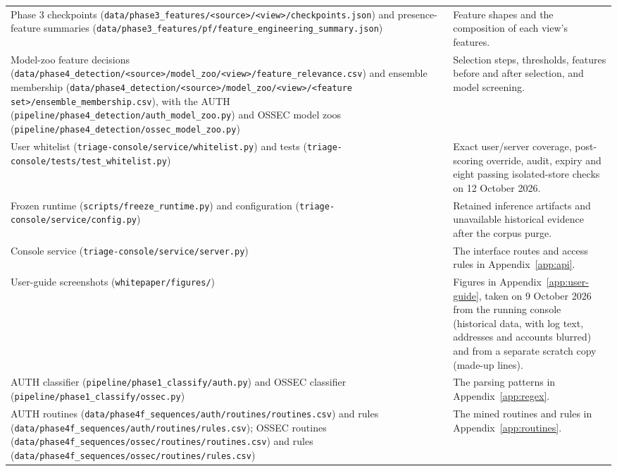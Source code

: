 \documentclass[11pt,a4paper]{article}
\newcommand{\projectref}[2]{#1 {\footnotesize(\nolinkurl{#2})}}
\begin{document}
\begin{longtable}{>{\RaggedRight\arraybackslash}p{}>{\RaggedRight\arraybackslash}p{}}
Phase 3 \projectref{checkpoints}{data/phase3_features/<source>/<view>/checkpoints.json} and \projectref{presence-feature summaries}{data/phase3_features/pf/feature_engineering_summary.json} & Feature shapes and the composition of each view's features. \\[3pt]
Model-zoo \projectref{feature decisions}{data/phase4_detection/<source>/model_zoo/<view>/feature_relevance.csv} and \projectref{ensemble membership}{data/phase4_detection/<source>/model_zoo/<view>/<feature set>/ensemble_membership.csv}, with \projectref{the AUTH}{pipeline/phase4_detection/auth_model_zoo.py} and \projectref{OSSEC model zoos}{pipeline/phase4_detection/ossec_model_zoo.py} & Selection steps, thresholds, features before and after selection, and model screening. \\[3pt]
\projectref{User whitelist}{triage-console/service/whitelist.py} and \projectref{tests}{triage-console/tests/test_whitelist.py} & Exact user/server coverage, post-scoring override, audit, expiry and eight passing isolated-store checks on 12 October 2026. \\[3pt]
\projectref{Frozen runtime}{scripts/freeze_runtime.py} and \projectref{configuration}{triage-console/service/config.py} & Retained inference artifacts and unavailable historical evidence after the corpus purge. \\[3pt]
\projectref{Console service}{triage-console/service/server.py} & The interface routes and access rules in Appendix~\ref{app:api}. \\[3pt]
\projectref{User-guide screenshots}{whitepaper/figures/} & Figures in Appendix~\ref{app:user-guide}, taken on 9 October 2026 from the running console (historical data, with log text, addresses and accounts blurred) and from a separate scratch copy (made-up lines). \\[3pt]
\projectref{AUTH classifier}{pipeline/phase1_classify/auth.py} and \projectref{OSSEC classifier}{pipeline/phase1_classify/ossec.py} & The parsing patterns in Appendix~\ref{app:regex}. \\[3pt]
AUTH \projectref{routines}{data/phase4f_sequences/auth/routines/routines.csv} and \projectref{rules}{data/phase4f_sequences/auth/routines/rules.csv}; OSSEC \projectref{routines}{data/phase4f_sequences/ossec/routines/routines.csv} and \projectref{rules}{data/phase4f_sequences/ossec/routines/rules.csv} & The mined routines and rules in Appendix~\ref{app:routines}. \\[3pt]
\end{longtable}
\endgroup
\end{document}

